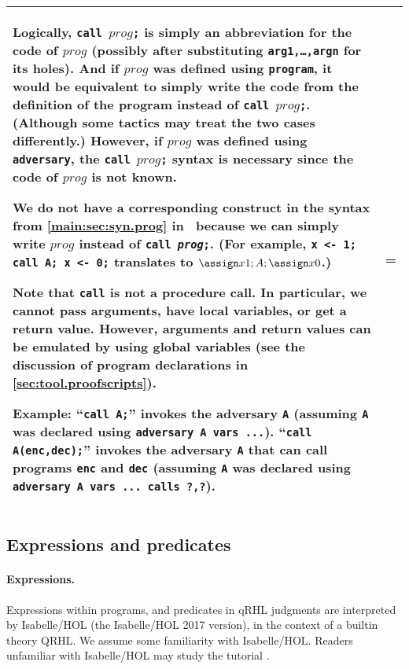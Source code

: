 \documentclass{article}
\newcommand\qrhlautoref[1]{\autoref*{main:#1} in~\cite{qrhl-paper-from-manual}}
\begin{document}
\begin{longtable}{|p{.275\hsize}|>{\parskip=\medskipamount}p{.66\hsize}|}
  Logically, \texttt{call $\mathit{prog}$;}
  is simply an abbreviation for the code of $\mathit{prog}$
  (possibly after substituting \texttt{arg1,\dots,argn} for its holes).
  And if $\mathit{prog}$
  was defined using \texttt{program}, it would be equivalent to simply
  write the code from the definition of the program instead of
  \texttt{call $\mathit{prog}$;}.
  (Although some tactics may treat the two cases differently.)
  However, if $\mathit{prog}$
  was defined using \texttt{adversary}, the \texttt{call
    $\mathit{prog}$;}
  syntax is necessary since the code of $\mathit{prog}$ is not known.

  We do not have a corresponding construct in the syntax from
  \qrhlautoref{sec:syn.prog} because we can simply write $\mathit{prog}$
  instead of \texttt{call \textit{prog};}. (For example, \texttt{x <-
    1; call A; x <- 0;} translates to $\assign x1;A;\assign x0$.)

  Note that \texttt{call} is not a procedure call. In particular, we
  cannot pass arguments, have local variables, or get a return
  value. However, arguments and return values can be emulated
  by using global variables (see the discussion of program
  declarations in \autoref{sec:tool.proofscripts}).

  \textbf{Example:} ``\texttt{call A;}'' invokes the adversary \texttt{A}
  (assuming \texttt{A} was declared using \texttt{adversary A vars
    ...}).  ``\texttt{call A(enc,dec);}'' invokes the adversary \texttt{A}
  that can call programs \texttt{enc} and \texttt{dec}
  (assuming \texttt{A} was declared using \texttt{adversary A vars
    ... calls ?,?}).
  \\
  \hline
\end{longtable}

\subsection{Expressions and predicates}
\label{sec:tool.pred}

\newcommand\tooltype[1]{\index{#1@\textttOLD{#1} (Isabelle/HOL type)}}

\paragraph{Expressions.}
Expressions within programs, and predicates in qRHL judgments are
interpreted by Isabelle/HOL (the Isabelle/HOL 2017 version), in the
context of a builtin theory QRHL. We assume some familiarity with
Isabelle/HOL. Readers unfamiliar with Isabelle/HOL may study the
tutorial \cite{isabelle-tutorial}.
\end{document}
